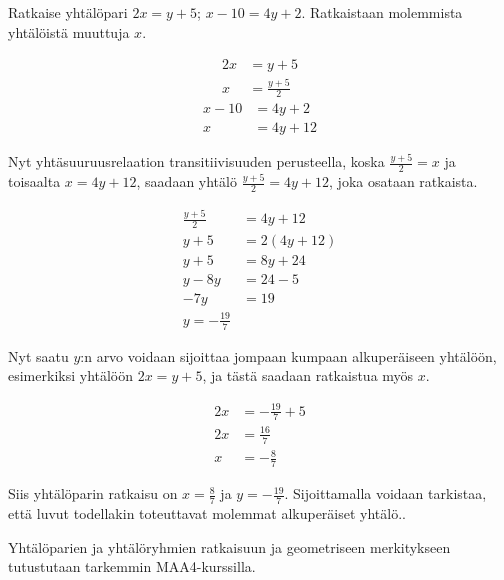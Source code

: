 \begin{esimerkki}
Ratkaise yhtälöpari $2x=y+5$; $x-10=4y+2$. Ratkaistaan molemmista yhtälöistä muuttuja $x$. 
	
	\begin{align*}
	    2x &= y+5 \\
	    x &= \frac{y+5}{2}
	\end{align*}
	\begin{align*}
	    x-10 &= 4y+2 \\
	    x &= 4y+12
	\end{align*}
	
Nyt yhtäsuuruusrelaation transitiivisuuden perusteella, koska $\frac{y+5}{2}=x$ ja toisaalta $x=4y+12$, saadaan yhtälö $\frac{y+5}{2}=4y+12$, joka osataan ratkaista.

\begin{align*}
	\frac{y+5}{2} &= 4y+12 \\
	y+5 &= 2(4y+12)\\
	y+5 &= 8y+24 \\
	y -8y&= 24-5 \\
	-7y &= 19 \\
	y=-\frac{19}{7}
\end{align*}

Nyt saatu $y$:n arvo voidaan sijoittaa jompaan kumpaan alkuperäiseen yhtälöön, esimerkiksi yhtälöön $2x=y+5$, ja tästä saadaan ratkaistua myös $x$.

\begin{align*}
      2x &= -\frac{19}{7}+5\\
      2x &= \frac{16}{7} \\
      x &= -\frac{8}{7}
\end{align*}

Siis yhtälöparin ratkaisu on $x=\frac{8}{7}$ ja $y=-\frac{19}{7}$. Sijoittamalla voidaan tarkistaa, että luvut todellakin toteuttavat molemmat alkuperäiset yhtälö..
\end{esimerkki} %

Yhtälöparien ja yhtälöryhmien ratkaisuun ja geometriseen merkitykseen tutustutaan tarkemmin MAA4-kurssilla.